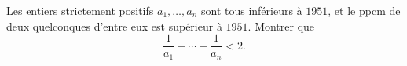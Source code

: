 Les entiers strictement positifs $a_1, \ldots, a_n$ sont tous inférieurs à $1951$, et le ppcm de deux quelconques d'entre eux est supérieur à $1951$. Montrer que
\[ \frac{1}{a_1} + \cdots + \frac{1}{a_n} < 2. \]
